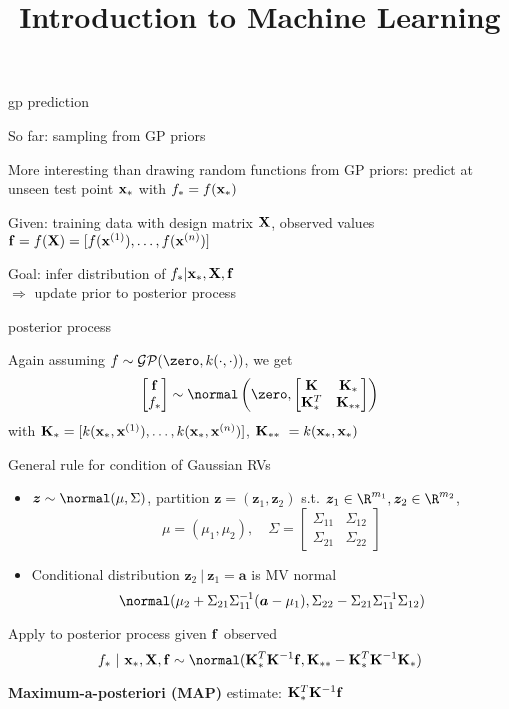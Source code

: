 \documentclass[11pt,compress,t,notes=noshow, xcolor=table]{beamer}
\title{Introduction to Machine Learning}
\begin{document}

\begin{framei}[sep=L]{gp prediction}
\item So far: sampling from GP priors
\item More interesting than drawing random functions from GP priors: predict at unseen test point $\xv_\ast$ with $f_\ast = f(\xv_\ast)$
\item Given: training data with design matrix $\Xmat$, observed values $\fv = f(\Xmat) = \fvec$
\item Goal: infer distribution of $f_\ast | \xv_\ast, \Xmat, \fv$ \\$\Rightarrow$ update prior to posterior process
\end{framei}

\begin{framei}[sep=M]{posterior process}
\item Again assuming $f \sim \mathcal{GP}(\zero, k(\cdot, \cdot))$, we get
$$\begin{bmatrix}
\fv \\ f_\ast
\end{bmatrix} \sim  
\normal \left(\zero, \begin{bmatrix} \Kmat & \Kmat_* \\ \Kmat_*^T & \Kmat_{**}\end{bmatrix}\right)$$
with $\Kmat_* = [k(\xv_*, \xi[1]), \dots, k(\xv_*, \xi[n])]$,  $ \Kmat_{**}\ = k(\xv_*, \xv_*)$
\item General rule for condition of Gaussian RVs
\begin{itemize}
\item $\bm{z} \sim \normal(\mu, \Sigma)$, partition $\bm{z} = (\bm{z}_1, \bm{z}_2)$ s.t. $\bm{z}_1 \in \R^{m_1}, \bm{z}_2 \in \R^{m_2}$, $$\mu = (\mu_1, \mu_2), \quad \Sigma = \begin{bmatrix} \Sigma_{11} & \Sigma_{12} \\ \Sigma_{21} & \Sigma_{22} \end{bmatrix} $$
\item Conditional distribution $\bm{z}_2 ~|~ \bm{z}_1 = \bm{a}$ is MV normal 
$$\normal(\mu_2 + \Sigma_{21} \Sigma_{11}^{-1} (\bm{a} - \mu_1), \Sigma_{22} - \Sigma_{21}\Sigma_{11}^{-1} \Sigma_{12})$$
\end{itemize}
\item Apply to posterior process given $\fv$ observed $$f_* ~|~ \xv_*, \Xmat, \fv \sim \normal(\Kmat_{*}^{T}\Kmat^{-1}\fv, \Kmat_{**} - \Kmat_*^T \Kmat ^{-1}\Kmat_*)$$
\item \textbf{Maximum-a-posteriori (MAP)} estimate: $\Kmat_{*}^{T}\Kmat^{-1}\fv$
\end{framei}
\end{document}
